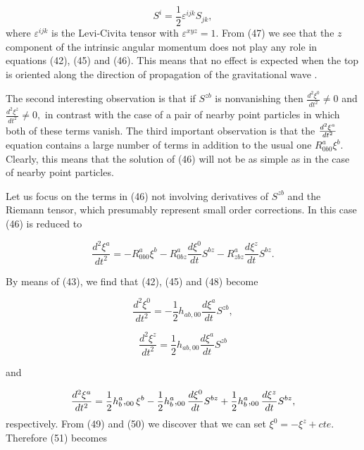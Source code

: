 \documentclass[a4paper,12pt]{article}
\begin{document}
\begin{equation}
S^{i}=\frac{1}{2}\varepsilon ^{ijk}S_{jk},  \label{47}
\end{equation}
where $\varepsilon ^{ijk}$ is the Levi-Civita tensor with $\varepsilon
^{xyz}=1.$ From (47) we see that the $z$ component of the intrinsic angular
momentum does not play any role in equations (42), (45) and (46). This means
that no effect is expected when the top is oriented along the direction of
propagation of the gravitational wave .

The second interesting observation is that if $S^{zb}$ is nonvanishing then $%
\frac{d^{2}\xi ^{0}}{dt^{2}}\neq 0$ and $\frac{d^{2}\xi ^{z}}{dt^{2}}\neq 0,$
in contrast with the case of a pair of nearby point particles in which both
of these terms vanish. The third important observation is that the $\frac{%
d^{2}\xi ^{a}}{dt^{2}}$ equation contains a large number of terms in
addition to the usual one $R_{0b0}^{a}\xi ^{b}.$ Clearly, this means that
the solution of (46) will not be as simple as in the case of nearby point
particles.

Let us focus on the terms in (46) not involving derivatives of $S^{zb}$ and
the Riemann tensor, which presumably represent small order corrections. In
this case (46) is reduced to

\begin{equation}
\frac{d^{2}\xi ^{a}}{dt^{2}}=-R_{0b0}^{a}\xi ^{b}-R_{0bz}^{a}\frac{d\xi ^{0}%
}{dt}S^{bz}-R_{zbz}^{a}\frac{d\xi ^{z}}{dt}S^{bz}.  \label{48}
\end{equation}

By means of (43), we find that (42), (45) and (48) become

\begin{equation}
\frac{d^{2}\xi^{0}}{dt^{2}}=-\frac{1}{2}h_{ab,00}\frac{d\xi^{a}}{dt}S^{zb},
\label{49}
\end{equation}

\begin{equation}
\frac{d^{2}\xi ^{z}}{dt^{2}}=\frac{1}{2}h_{ab,00}\frac{d\xi ^{a}}{dt}S^{zb}
\label{50}
\end{equation}

and

\begin{equation}
\frac{d^{2}\xi ^{a}}{dt^{2}}=\frac{1}{2}h_{b}^{a},_{00}\xi ^{b}-\frac{1}{2}%
h_{b}^{a},_{00}\frac{d\xi ^{0}}{dt}S^{bz}+\frac{1}{2}h_{b}^{a},_{00}\frac{%
d\xi ^{z}}{dt}S^{bz},  \label{51}
\end{equation}
respectively. From (49) and (50) we discover that we can set $\xi ^{0}=-\xi
^{z}+cte.$ Therefore (51) becomes
\end{document}
